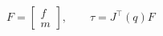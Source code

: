 \documentclass[border=3pt]{standalone}
\begin{document}
{\fontsize{22}{27}\selectfont \color{black}$\displaystyle
F=\begin{bmatrix}f\\m\end{bmatrix},\qquad
\tau=J^\top(q)F$}
\end{document}
